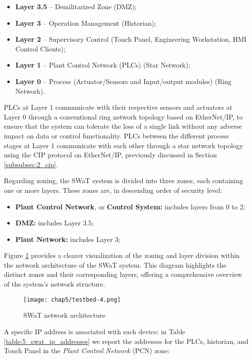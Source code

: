 \begin{itemize}
	\item \textbf{Layer 3.5} -- Demilitarized Zone (DMZ);
	\item \textbf{Layer 3} -- Operation Management (Historian);
	\item \textbf{Layer 2} -- Supervisory Control (Touch Panel, Engineering Workstation, HMI Control Clients);
	\item \textbf{Layer 1} -- Plant Control Network (PLCs) (Star Network);
	\item \textbf{Layer 0} -- Process (Actuator/Sensors and Input/output modules) (Ring Network).
\end{itemize}
PLCs at Layer 1 communicate with their respective sensors and actuators at Layer 0 through a conventional ring network topology based on EtherNet/IP, to ensure that the system can tolerate the loss of a single link without any adverse impact on data or control functionality.\newline
PLCs between the different process stages at Layer 1 communicate with each other through a star network topology using the CIP protocol on EtherNet/IP, previously discussed in Section \ref{subsubsec:2_cip}.

\bigskip
Regarding zoning, the SWaT system is divided into three zones, each containing one or more layers. These zones are, in descending order of security level: 

\begin{itemize}
	\item \textbf{Plant Control Network}, or \textbf{Control System:} includes layers from 0 to 2;
	\item \textbf{DMZ:} includes Layer 3.5;
	\item \textbf{Plant Network:} includes Layer 3;
\end{itemize}

\noindent Figure \ref{fig:5_swat_network_arch} provides a clearer visualization of the zoning and layer division within the network architecture of the SWaT system. This diagram highlights the distinct zones and their corresponding layers, offering a comprehensive overview of the system's network structure.

\begin{figure}[ht]
	\centering
	\texttt{[image: chap5/testbed-4.png]}
	\caption{SWaT network architecture}
	\label{fig:5_swat_network_arch}
\end{figure}

A specific IP address is associated with each device: in Table \ref{table:5_swat_ip_addresses} we report the addresses for the PLCs, historian, and Touch Panel in the \textit{Plant Control Network} (PCN) zone:


